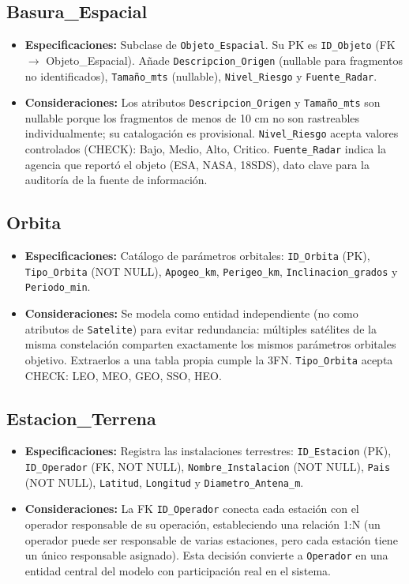 \subsection{Basura\_Espacial}

\begin{itemize}
    \item \textbf{Especificaciones:} Subclase de \texttt{Objeto\_Espacial}. Su PK es \texttt{ID\_Objeto} (FK $\rightarrow$ Objeto\_Espacial). Añade \texttt{Descripcion\_Origen} (nullable para fragmentos no identificados), \texttt{Tamaño\_mts} (nullable), \texttt{Nivel\_Riesgo} y \texttt{Fuente\_Radar}.
    \item \textbf{Consideraciones:} Los atributos \texttt{Descripcion\_Origen} y \texttt{Tamaño\_mts} son nullable porque los fragmentos de menos de 10 cm no son rastreables individualmente; su catalogación es provisional. \texttt{Nivel\_Riesgo} acepta valores controlados (CHECK): Bajo, Medio, Alto, Critico. \texttt{Fuente\_Radar} indica la agencia que reportó el objeto (ESA, NASA, 18SDS), dato clave para la auditoría de la fuente de información.
\end{itemize}

\subsection{Orbita}

\begin{itemize}
    \item \textbf{Especificaciones:} Catálogo de parámetros orbitales: \texttt{ID\_Orbita} (PK), \texttt{Tipo\_Orbita} (NOT NULL), \texttt{Apogeo\_km}, \texttt{Perigeo\_km}, \texttt{Inclinacion\_grados} y \texttt{Periodo\_min}.
    \item \textbf{Consideraciones:} Se modela como entidad independiente (no como atributos de \texttt{Satelite}) para evitar redundancia: múltiples satélites de la misma constelación comparten exactamente los mismos parámetros orbitales objetivo. Extraerlos a una tabla propia cumple la 3FN. \texttt{Tipo\_Orbita} acepta CHECK: LEO, MEO, GEO, SSO, HEO.
\end{itemize}

\subsection{Estacion\_Terrena}

\begin{itemize}
    \item \textbf{Especificaciones:} Registra las instalaciones terrestres: \texttt{ID\_Estacion} (PK), \texttt{ID\_Operador} (FK, NOT NULL), \texttt{Nombre\_Instalacion} (NOT NULL), \texttt{Pais} (NOT NULL), \texttt{Latitud}, \texttt{Longitud} y \texttt{Diametro\_Antena\_m}.
    \item \textbf{Consideraciones:} La FK \texttt{ID\_Operador} conecta cada estación con el operador responsable de su operación, estableciendo una relación 1:N (un operador puede ser responsable de varias estaciones, pero cada estación tiene un único responsable asignado). Esta decisión convierte a \texttt{Operador} en una entidad central del modelo con participación real en el sistema.
\end{itemize}

